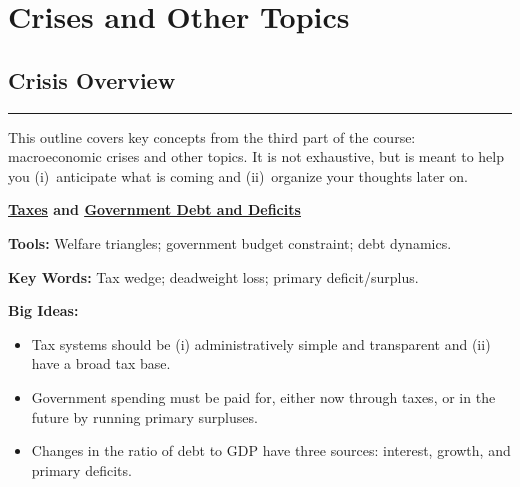 \part{Crises and Other Topics}


\chapter*{Crisis Overview}
\hypertarget{}{}

\rule{\textwidth}{1pt}

This outline covers key concepts from the third part of the course:
macroeconomic crises and other topics.
It is not exhaustive, but is meant to help you
(i)~anticipate what is coming and
(ii)~organize your thoughts later on.

\medskip
\textbf{\hyperref[chp:tax]{\underline{Taxes}} and \hyperref[chp:dbdf]{\underline{Government Debt and Deficits}}}

\textbf{Tools:} Welfare triangles; government budget constraint; debt dynamics.

\textbf{Key Words:} Tax wedge; deadweight loss; primary deficit/surplus.

\textbf{Big Ideas:}
\vspace{-0.1in}
\begin{itemize}
\item Tax systems should be (i) administratively simple and transparent and (ii) have a broad tax base. 
\item Government spending must be paid for, either now through taxes, or in the
future by running primary surpluses.
\item Changes in the ratio of debt to GDP have three sources:
interest, growth, and primary deficits.
\end{itemize}


\begin{comment}
\hyperref[chp:bop]{\textbf{\underline{Balance of Payments}}}

\textbf{Tools:} Sustainability analysis.

\textbf{Key Words:} Current account; net exports; capital account; net foreign assets.

\textbf{Big Ideas:}
\vspace{-0.1in}
\begin{itemize}
\item Current account deficits imply that the country is borrowing from the rest of the
world; current account surpluses mean that the country is lending to the rest of the
world.
\item Balance of payment deficits are unsustainable when net foreign liabilities grow faster than the economy as a whole.
\end{itemize}
\end{comment}


